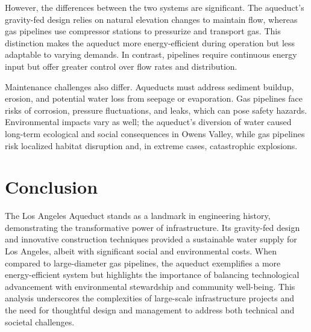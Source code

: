 \documentclass[12pt]{article}
\begin{document}
However, the differences between the two systems are significant. The aqueduct's gravity-fed design relies on natural elevation changes to maintain flow, whereas gas pipelines use compressor stations to pressurize and transport gas. This distinction makes the aqueduct more energy-efficient during operation but less adaptable to varying demands. In contrast, pipelines require continuous energy input but offer greater control over flow rates and distribution.

Maintenance challenges also differ. Aqueducts must address sediment buildup, erosion, and potential water loss from seepage or evaporation. Gas pipelines face risks of corrosion, pressure fluctuations, and leaks, which can pose safety hazards. Environmental impacts vary as well; the aqueduct's diversion of water caused long-term ecological and social consequences in Owens Valley, while gas pipelines risk localized habitat disruption and, in extreme cases, catastrophic explosions.

\section*{\small{Conclusion}}

The Los Angeles Aqueduct stands as a landmark in engineering history, demonstrating the transformative power of infrastructure. Its gravity-fed design and innovative construction techniques provided a sustainable water supply for Los Angeles, albeit with significant social and environmental costs. When compared to large-diameter gas pipelines, the aqueduct exemplifies a more energy-efficient system but highlights the importance of balancing technological advancement with environmental stewardship and community well-being. This analysis underscores the complexities of large-scale infrastructure projects and the need for thoughtful design and management to address both technical and societal challenges.
\end{document}
